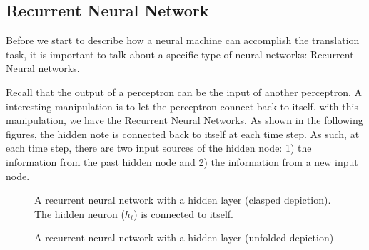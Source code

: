 \subsection{Recurrent Neural Network}

Before we start to describe how a neural machine can accomplish the translation task, it is important to talk about a specific type of neural networks: Recurrent Neural networks. 

Recall that the output of a perceptron can be the input of another perceptron. A interesting manipulation is to let the perceptron connect back to itself. with this manipulation, we have the Recurrent Neural Networks. As shown in the following figures, the hidden note is connected back to itself at each time step. As such, at each time step, there are two input sources of the hidden node: 1) the information from the past hidden node and 2) the information from a new input node.       

\begin{figure}
\caption{A recurrent neural network with a hidden layer (clasped depiction). The hidden neuron ($h_{t}$) is connected to itself.}
\centering
{}
\end{figure}

\begin{figure}
\caption{A recurrent neural network with a hidden layer (unfolded depiction)}
\centering
{}
\end{figure}


